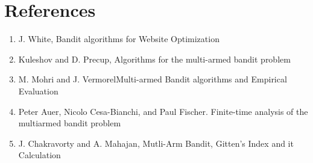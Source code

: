 \documentclass{article}
\begin{document}
\section{References}

\begin{enumerate}
\item J. White, Bandit algorithms for Website Optimization
\item Kuleshov and D. Precup, Algorithms for the multi-armed bandit problem
\item M. Mohri and J. VermorelMulti-armed Bandit algorithms and Empirical Evaluation
\item Peter Auer, Nicolo Cesa-Bianchi, and Paul Fischer. Finite-time analysis of the multiarmed bandit problem
\item J. Chakravorty and A. Mahajan, Mutli-Arm Bandit, Gitten's Index and it Calculation
\end{enumerate}
\end{document}
